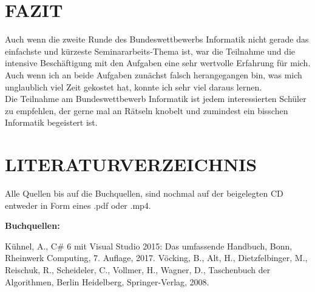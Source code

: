 \documentclass[a4paper,12pt]{article}
\begin{document}
\newpage
\section{FAZIT}
Auch wenn die zweite Runde des Bundeswettbewerbs Informatik nicht gerade das einfachste und kürzeste Seminararbeits-Thema ist, war die Teilnahme und die intensive Beschäftigung mit den Aufgaben eine sehr wertvolle Erfahrung für mich.
\\[0.4cm]
Auch wenn ich an beide Aufgaben zunächst falsch herangegangen bin, was mich unglaublich viel Zeit gekostet hat, konnte ich sehr viel daraus lernen.
\\[0.4cm]
Die Teilnahme am Bundeswettbewerb Informatik ist jedem interessierten Schüler zu empfehlen, der gerne mal an Rätseln knobelt und zumindest ein bisschen Informatik begeistert ist.



\newpage
\section{LITERATURVERZEICHNIS}
Alle Quellen bis auf die Buchquellen, sind nochmal auf der beigelegten CD entweder in Form eines .pdf oder .mp4.
\vspace{1cm}

\begingroup
\renewcommand{\section}[2]{}%
\begin{large}
\textbf{Buchquellen:}
\end{large}

\begin{thebibliography}{9}

      Kühnel, A.,
      C\# 6 mit Visual Studio 2015: Das umfassende Handbuch,
      Bonn, Rheinwerk Computing,
      7. Auflage,
      2017.
      Vöcking, B., Alt, H., Dietzfelbinger, M., Reischuk, R., Scheideler, C., Vollmer, H., Wagner, D.,
      Taschenbuch der Algorithmen,
      Berlin Heidelberg, Springer-Verlag,
      2008.

\end{thebibliography}
\end{document}
